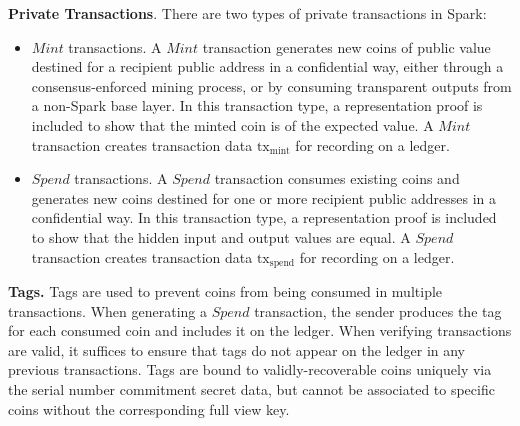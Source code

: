\documentclass{llncs}
\begin{document}
\textbf{Private Transactions}. There are two types of private transactions in Spark:
\begin{itemize}
    \item $Mint$ transactions.
    A $Mint$ transaction generates new coins of public value destined for a recipient public address in a confidential way, either through a consensus-enforced mining process, or by consuming transparent outputs from a non-Spark base layer.
    In this transaction type, a representation proof is included to show that the minted coin is of the expected value.
    A $Mint$ transaction creates transaction data $\text{tx}_{\text{mint}}$ for recording on a ledger.
    \item $Spend$ transactions.
    A $Spend$ transaction consumes existing coins and generates new coins destined for one or more recipient public addresses in a confidential way.
    In this transaction type, a representation proof is included to show that the hidden input and output values are equal.
    A $Spend$ transaction creates transaction data $\text{tx}_{\text{spend}}$ for recording on a ledger.
\end{itemize}

\textbf{Tags.} Tags are used to prevent coins from being consumed in multiple transactions.
When generating a $Spend$ transaction, the sender produces the tag for each consumed coin and includes it on the ledger.
When verifying transactions are valid, it suffices to ensure that tags do not appear on the ledger in any previous transactions.
Tags are bound to validly-recoverable coins uniquely via the serial number commitment secret data, but cannot be associated to specific coins without the corresponding full view key.
\end{document}
